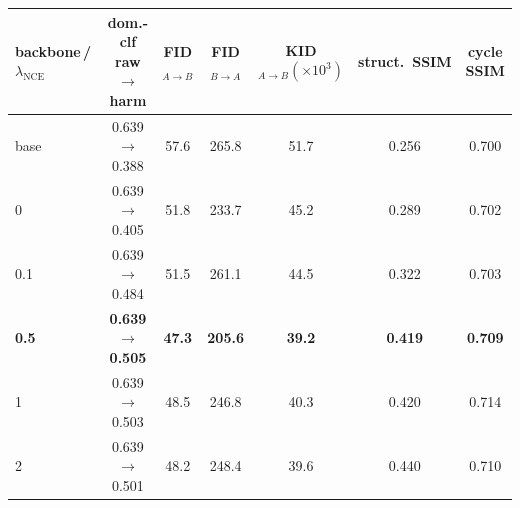 \begin{tabular}{lcccccc}
\toprule
backbone\,/\,$\lambda_{\mathrm{NCE}}$ & dom.-clf raw$\to$harm & FID$_{A\to B}$ & FID$_{B\to A}$ & KID$_{A\to B}(\times10^3)$ & struct.\ SSIM & cycle SSIM \\
\midrule
base & 0.639$\to$0.388 & 57.6 & 265.8 & 51.7 & 0.256 & 0.700 \\
\midrule
0 & 0.639$\to$0.405 & 51.8 & 233.7 & 45.2 & 0.289 & 0.702 \\
0.1 & 0.639$\to$0.484 & 51.5 & 261.1 & 44.5 & 0.322 & 0.703 \\
\textbf{0.5} & \textbf{0.639$\to$0.505} & \textbf{47.3} & \textbf{205.6} & \textbf{39.2} & \textbf{0.419} & \textbf{0.709} \\
1 & 0.639$\to$0.503 & 48.5 & 246.8 & 40.3 & 0.420 & 0.714 \\
2 & 0.639$\to$0.501 & 48.2 & 248.4 & 39.6 & 0.440 & 0.710 \\
\bottomrule
\end{tabular}
